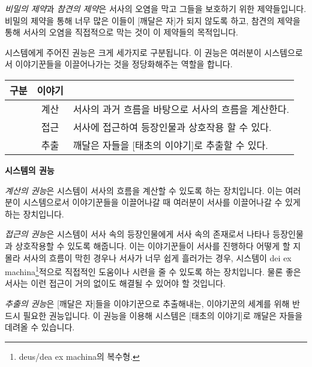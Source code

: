 \documentclass{report}
\begin{document}
	\smallskip
	
	\emph{비밀의 제약}과 \emph{참견의 제약}은 서사의 오염을 막고 그들을 보호하기 위한 제약들입니다. 비밀의 제약을 통해 너무 많은 이들이 [깨달은 자]가 되지 않도록 하고, 참견의 제약을 통해 서사의 오염을 직접적으로 막는 것이 이 제약들의 목적입니다.
	
	\bigskip
	
	시스템에게 주어진 권능은 크게 세가지로 구분됩니다. 이 권능은 여러분이 시스템으로서 이야기꾼들을 이끌어나가는 것을 정당화해주는 역할을 합니다.
	
	\smallskip
	
	\begin{minipage}{\textwidth}
		\begin{tabularx}{\textwidth}{c!{\color{black}\vrule}c!{\color{black}\vrule}X}
			\hline
			\textbf{구분} & \textbf{이야기} &  \\ \hline \hline
			[권능:시스템] & 계산 & 서사의 과거 흐름을 바탕으로 서사의 흐름을 계산한다. \\ \hline
			[권능:시스템] & 접근 & 서사에 접근하여 등장인물과 상호작용 할 수 있다. \\ \hline
			[권능:시스템] & 추출 & 깨달은 자들을 [태초의 이야기]로 추출할 수 있다. \\ \hline
		\end{tabularx}
		
		\smallskip
		
		\begin{tightcenter}
			\textbf{시스템의 권능}
		\end{tightcenter}
	\end{minipage}
	
	\bigskip
	
	\emph{계산의 권능}은 시스템이 서사의 흐름을 계산할 수 있도록 하는 장치입니다. 이는 여러분이 시스템으로서 이야기꾼들을 이끌어나갈 때 여러분이 서사를 이끌어나갈 수 있게 하는 장치입니다.
	
	\smallskip
	
	\emph{접근의 권능}은 시스템이 서사 속의 등장인물에게 서사 속의 존재로서 나타나 등장인물과 상호작용할 수 있도록 해줍니다. 이는 이야기꾼들이 서사를 진행하다 어떻게 할 지 몰라 서사의 흐름이 막힌 경우나 서사가 너무 쉽게 흘러가는 경우, 시스템이 dei ex machina\footnote{deus/dea ex machina의 복수형.}적으로 직접적인 도움이나 시련을 줄 수 있도록 하는 장치입니다. 물론 좋은 서사는 이런 접근이 거의 없이도 해결될 수 있어야 할 것입니다.
	
	\smallskip
	
	\emph{추출의 권능}은 [깨달은 자]들을 이야기꾼으로 추출해내는, 이야기꾼의 세계를 위해 반드시 필요한 권능입니다. 이 권능을 이용해 시스템은 [태초의 이야기]로 깨달은 자들을 데려올 수 있습니다.
\end{document}
